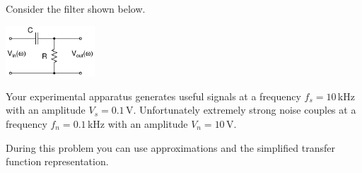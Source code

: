 \documentclass[letterpaper,addpoints,answers]{exam}
\begin{document}
\begin{questions}
 
\pagebreak

\question

Consider the filter shown below.
\begin{center}
 \includegraphics[width=0.25\textwidth]{./schematics/rc_high_pass}
\end{center}


\pagebreak

\question

Your experimental apparatus generates useful signals at a frequency $f_s = 10$\,kHz 
with an amplitude $V_s = 0.1$\,V.  Unfortunately extremely strong noise couples
at a frequency $f_n = 0.1$\,kHz with an amplitude $V_n = 10$\,V.

During this problem you can use approximations and the simplified transfer
function representation.

\begin{parts}

\end{parts}
\end{questions}
\end{document}
